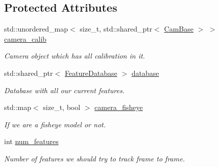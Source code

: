 \subsection*{Protected Attributes}
\begin{DoxyCompactItemize}
\item 
\mbox{\label{classov__core_1_1TrackBase_a052a06d61aadf4a12a8739f0221d3e6b}} 
std\+::unordered\+\_\+map$<$ size\+\_\+t, std\+::shared\+\_\+ptr$<$ \hyperlink{classov__core_1_1CamBase}{Cam\+Base} $>$ $>$ \hyperlink{classov__core_1_1TrackBase_a052a06d61aadf4a12a8739f0221d3e6b}{camera\+\_\+calib}
\begin{DoxyCompactList}\small\item\em Camera object which has all calibration in it. \end{DoxyCompactList}\item 
\mbox{\label{classov__core_1_1TrackBase_a832d13076b7d5ef3d6481deb5ce3000d}} 
std\+::shared\+\_\+ptr$<$ \hyperlink{classov__core_1_1FeatureDatabase}{Feature\+Database} $>$ \hyperlink{classov__core_1_1TrackBase_a832d13076b7d5ef3d6481deb5ce3000d}{database}
\begin{DoxyCompactList}\small\item\em Database with all our current features. \end{DoxyCompactList}\item 
\mbox{\label{classov__core_1_1TrackBase_a10325315c2e52ab8367097d57b7020c6}} 
std\+::map$<$ size\+\_\+t, bool $>$ \hyperlink{classov__core_1_1TrackBase_a10325315c2e52ab8367097d57b7020c6}{camera\+\_\+fisheye}
\begin{DoxyCompactList}\small\item\em If we are a fisheye model or not. \end{DoxyCompactList}\item 
\mbox{\label{classov__core_1_1TrackBase_a22e5b8a82308be5190933e5991891e9a}} 
int \hyperlink{classov__core_1_1TrackBase_a22e5b8a82308be5190933e5991891e9a}{num\+\_\+features}
\begin{DoxyCompactList}\small\item\em Number of features we should try to track frame to frame. \end{DoxyCompactList}\item 

\end{DoxyCompactItemize}
